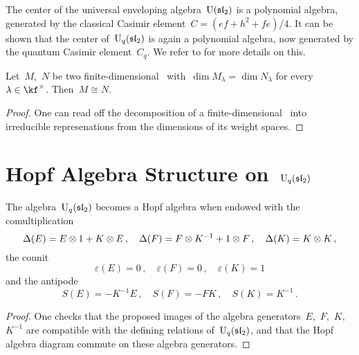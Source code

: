 \documentclass[a4paper, 11pt, oneside]{scrartcl}
\begin{document}
\begin{remark}
  The center of the universal enveloping algebra~$\operatorname{U}(\mathfrak{sl}_2)$ is a polynomial algebra, generated by the classical Casimir element~$C = (ef + h^2 + fe)/4$.
  It can be shown that the center of~$\operatorname{U}_q(\mathfrak{sl}_2)$ is again a polynomial algebra, now generated by the quantum Casimir element~$C_q$.
  We refer to \cite[Proposition~2.18]{jantzen_quantum} for more details on this.
\end{remark}

\begin{corollary}
  \label{decomposition from quantum weight spaces}
  Let~$M$,~$N$ be two finite-dimensional~ with~$\dim M_\lambda = \dim N_\lambda$ for every~$\lambda \in \kf^\times$.
  Then~$M \cong N$.
\end{corollary}

\begin{proof}
  One can read off the decomposition of a finite-dimensional~ into irreducible represenations from the dimensions of its weight spaces.
\end{proof}





\section{Hopf Algebra Structure on~$\operatorname{U}_q(\mathfrak{sl}_2)$}


\begin{proposition}
  \label{hopf algebra structure on quantum sl2}
  The algebra~$\operatorname{U}_q(\mathfrak{sl}_2)$ becomes a Hopf algebra when endowed with the comultiplication
  \[
    \Delta(E) = E \otimes 1 + K \otimes E \,,
    \quad
    \Delta(F) = F \otimes K^{-1} + 1 \otimes F \,,
    \quad
    \Delta(K) = K \otimes K \,,
  \]
  the counit
  \[
    \varepsilon(E) = 0 \,,
    \quad
    \varepsilon(F) = 0 \,,
    \quad
    \varepsilon(K) = 1
  \]
  and the antipode
  \[
    S(E) = -K^{-1} E \,,
    \quad
    S(F) = - F K \,,
    \quad
    S(K) =  K^{-1} \,.
  \]
\end{proposition}

\begin{proof}
  One checks that the proposed images of the algebra generators~$E$,~$F$,~$K$,~$K^{-1}$ are compatible with the defining relations of~$\operatorname{U}_q(\mathfrak{sl}_2)$, and that the Hopf algebra diagram commute on these algebra generators.
\end{proof}
\end{document}
